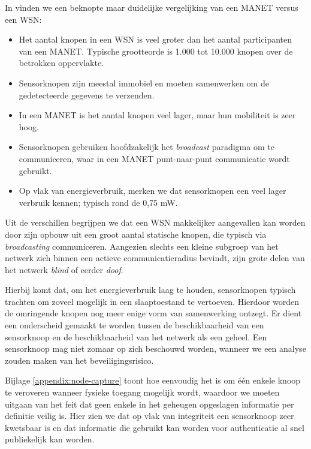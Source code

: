In \citep{garg2010mobile} vinden we een beknopte maar duidelijke vergelijking
van een MANET versus een WSN:

\begin{itemize}

  \item Het aantal knopen in een WSN is veel groter dan het aantal
  participanten van een MANET. Typische grootteorde is 1.000 tot 10.000 knopen
  over de betrokken oppervlakte.

  \item Sensorknopen zijn meestal immobiel en moeten samenwerken om de
  gedetecteerde gegevens te verzenden.

  \item In een MANET is het aantal knopen veel lager, maar hun mobiliteit is
  zeer hoog.

  \item Sensorknopen gebruiken hoofdzakelijk het \emph{broadcast} paradigma om
  te communiceren, waar in een MANET punt-naar-punt communicatie wordt gebruikt.

  \item Op vlak van energieverbruik, merken we dat sensorknopen een veel lager
  verbruik kennen; typisch rond de 0,75 mW.

\end{itemize}

Uit de verschillen begrijpen we dat een WSN makkelijker aangevallen kan worden
door zijn opbouw uit een groot aantal statische knopen, die typisch via
\emph{broadcasting} communiceren. Aangezien slechts een kleine subgroep van het
netwerk zich binnen een actieve communicatieradius bevindt, zijn grote delen
van het netwerk \emph{blind} of eerder \emph{doof}.

Hierbij komt dat, om het energieverbruik laag te houden, sensorknopen typisch
trachten om zoveel mogelijk in een slaaptoestand te vertoeven. Hierdoor worden
de omringende knopen nog meer enige vorm van samenwerking ontzegt. Er dient een
onderscheid gemaakt te worden tussen de beschikbaarheid van een sensorknoop en
de beschikbaarheid van het netwerk als een geheel. Een sensorknoop mag niet
zomaar op zich beschouwd worden, wanneer we een analyse zouden maken van het
beveiligingsrisico.

Bijlage \ref{appendix:node-capture} toont hoe eenvoudig het is om \'e\'en
enkele knoop te veroveren wanneer fysieke toegang mogelijk wordt, waardoor we
moeten uitgaan van het feit dat geen enkele in het geheugen opgeslagen
informatie per definitie veilig is. Hier zien we dat op vlak van integriteit
een sensorknoop zeer kwetsbaar is en dat informatie die gebruikt kan worden
voor authenticatie al snel publiekelijk kan worden.

